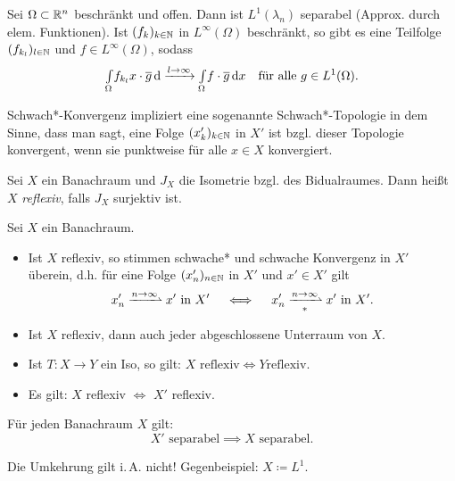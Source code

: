 \documentclass{cheat-sheet}
\newcommand{\IntO}[2]{\Int{\Omega}{}{#1}{#2}} %
\newcommand{\convWith}[1]{\xrightarrow{#1 \to \infty}} %
\newcommand{\convWeaklyWith}[1]{\xrightharpoonup{#1 \to \infty}} %
\newcommand{\convWeaklyStarWith}[1]{\xrightharpoonup[*]{#1 \to \infty}} %
\begin{document}
\begin{bsp}
  Sei $\Omega \subset \mathbb{R}^n$ beschränkt und offen. Dann ist $L^1(\lambda_n)$ separabel (Approx. durch elem. Funktionen). Ist $(f_k)_{k \in \mathbb{N}}$ in $L^{\infty}(\Omega)$ beschränkt, so gibt es eine Teilfolge $(f_{k_l})_{l \in \mathbb{N}}$ und $f \in L^\infty(\Omega)$, sodass
  \[ \IntO{f_{k_l}{x} \cdot \overline{g}} \convWith{l} \IntO{f \cdot \overline{g}}{x} \quad \text{für alle $g \in L^1(\Omega)$}. \]
\end{bsp}

\begin{bem}
  Schwach*-Konvergenz impliziert eine sogenannte Schwach*-Topologie in dem Sinne, dass man sagt, eine Folge $(x_k')_{k \in \mathbb{N}}$ in $X'$ ist bzgl. dieser Topologie konvergent, wenn sie punktweise für alle $x \in X$ konvergiert.
\end{bem}

\begin{defn}
  Sei $X$ ein Banachraum und $J_X$ die Isometrie bzgl. des Bidualraumes. Dann heißt $X$ \emph{reflexiv}, falls $J_X$ surjektiv ist.
\end{defn}

\begin{lem}
  Sei $X$ ein Banachraum.
  \begin{itemize}
    \item Ist $X$ reflexiv, so stimmen schwache* und schwache Konvergenz in $X'$ überein, d.h. für eine Folge $(x'_n)_{n \in \mathbb{N}}$ in $X'$ und $x' \in X'$ gilt
    \[ x_n' \convWeaklyWith{n} x' \text{ in } X' \quad \iff \quad x_n' \convWeaklyStarWith{n} x' \text{ in } X'. \]
    \item Ist $X$ reflexiv, dann auch jeder abgeschlossene Unterraum von $X$.
    \item Ist $T : X \to Y$ ein Iso, so gilt: $X \text{ reflexiv} \iff Y \text{reflexiv}$.
    \item Es gilt: $X$ reflexiv $\iff$ $X'$ reflexiv.
  \end{itemize}
\end{lem}


\begin{lem}
  Für jeden Banachraum $X$ gilt:
  \[ X' \text{ separabel} \implies X \text{ separabel.} \]
\end{lem}

\begin{bem}
  Die Umkehrung gilt i.\,A. nicht! Gegenbeispiel: $X \coloneqq L^1$.
\end{bem}
\end{document}
